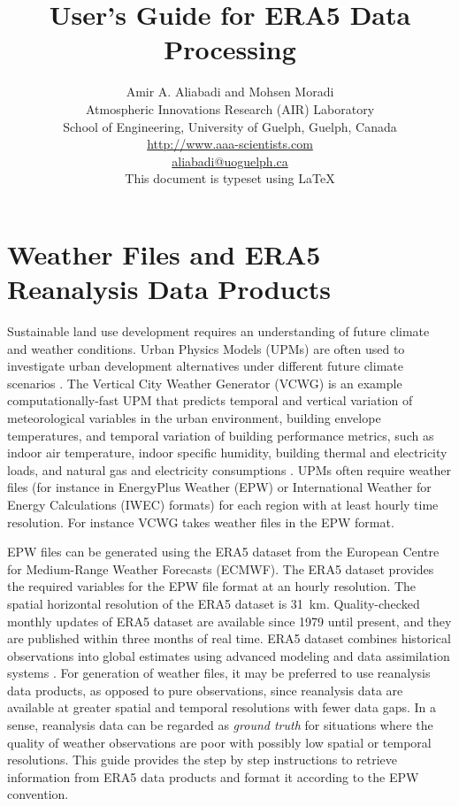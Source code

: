 \documentclass[12pt]{article}
\title{User's Guide for ERA5 Data Processing}
\author{Amir A. Aliabadi and Mohsen Moradi\\
	Atmospheric Innovations Research (AIR) Laboratory \\
School of Engineering, University of Guelph, Guelph, Canada \\
\small \url{http://www.aaa-scientists.com} \\
\small \href{mailto:aliabadi@uoguelph.ca}{aliabadi@uoguelph.ca} \\
\small This document is typeset using \LaTeX \\
}
\begin{document}
\maketitle

\section{Weather Files and ERA5 Reanalysis Data Products}

Sustainable land use development requires an understanding of future climate and weather conditions. Urban Physics Models (UPMs) are often used to investigate urban development alternatives under different future climate scenarios \cite{Portner2022}. The Vertical City Weather Generator (VCWG) is an example computationally-fast UPM that predicts temporal and vertical variation of meteorological variables in the urban environment, building envelope temperatures, and temporal variation of building performance metrics, such as indoor air temperature, indoor specific humidity, building thermal and electricity loads, and natural gas and electricity consumptions \cite{Moradi2021a, Aliabadi2021b, Moradi2022}. UPMs often require weather files (for instance in EnergyPlus Weather (EPW) or International Weather for Energy Calculations (IWEC) formats) for each region with at least hourly time resolution. For instance VCWG takes weather files in the EPW format. 

EPW files can be generated using the ERA5 dataset from the European Centre for Medium-Range Weather Forecasts (ECMWF). The ERA5 dataset provides the required variables for the EPW file format at an hourly resolution. The spatial horizontal resolution of the ERA5 dataset is \SI{31}{km}. Quality-checked monthly updates of ERA5 dataset are available since 1979 until present, and they are published within three months of real time. ERA5 dataset combines historical observations into global estimates using advanced modeling and data assimilation systems \cite{Hersbach2020}. For generation of weather files, it may be preferred to use reanalysis data products, as opposed to pure observations, since reanalysis data are available at greater spatial and temporal resolutions with fewer data gaps. In a sense, reanalysis data can be regarded as \emph{ground truth} for situations where the quality of weather observations are poor with possibly low spatial or temporal resolutions. This guide provides the step by step instructions to retrieve information from ERA5 data products and format it according to the EPW convention.
\end{document}
